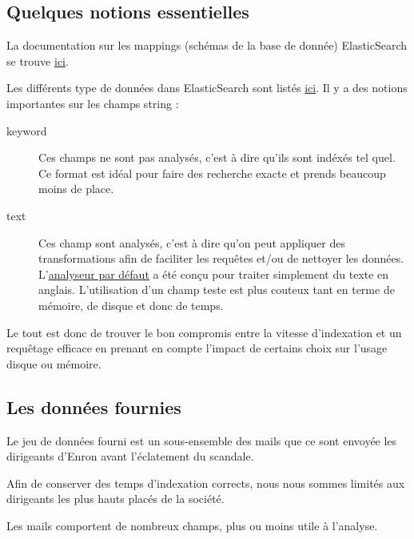 \documentclass[11pt,letterpaper]{article}
\begin{document}
	\subsection*{Quelques notions essentielles}
	La documentation sur les mappings (schémas de la base de donnée) ElasticSearch se trouve \href{https://www.elastic.co/guide/en/elasticsearch/reference/6.4/mapping.html}{ici}.
	
	Les différents type de données dans ElasticSearch sont listés \href{https://www.elastic.co/guide/en/elasticsearch/reference/6.4/mapping-types.html}{ici}.
	Il y a des notions importantes sur les champs string :
	\begin{description}
		\item[keyword] Ces champs ne sont pas analysés, c'est à dire qu'ils sont indéxés tel quel. Ce format est idéal pour faire des recherche exacte et prends beaucoup moins de place.
		\item[text] Ces champ sont analysés, c'est à dire qu'on peut appliquer des transformations afin de faciliter les requêtes et/ou de nettoyer les données. L'\href{https://www.elastic.co/guide/en/elasticsearch/reference/6.4/analysis-standard-analyzer.html}{analyseur par défaut} a été conçu pour traiter simplement du texte en anglais. L'utilisation d'un champ teste est plus couteux tant en terme de mémoire, de disque et donc de temps.
	\end{description}
	Le tout est donc de trouver le bon compromis entre la vitesse d'indexation et un requêtage efficace en prenant en compte l'impact de certains choix sur l'usage disque ou mémoire.
	\subsection*{Les données fournies}
	Le jeu de données fourni est un sous-ensemble des mails que ce sont envoyée les dirigeants d'Enron avant l'éclatement du scandale.
	
	Afin de conserver des temps d'indexation corrects, nous nous sommes limités aux dirigeants les plus hauts placés de la société.
	
	Les mails comportent de nombreux champs, plus ou moins utile à l'analyse.
	
\end{document}
